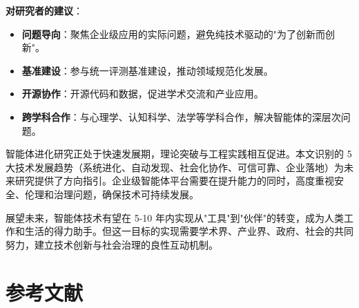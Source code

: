 \documentclass[12pt,a4paper]{article}
\begin{document}
\textbf{对研究者的建议}：
\begin{itemize}
    \item \textbf{问题导向}：聚焦企业级应用的实际问题，避免纯技术驱动的"为了创新而创新"。
    \item \textbf{基准建设}：参与统一评测基准建设，推动领域规范化发展。
    \item \textbf{开源协作}：开源代码和数据，促进学术交流和产业应用。
    \item \textbf{跨学科合作}：与心理学、认知科学、法学等学科合作，解决智能体的深层次问题。
\end{itemize}

智能体进化研究正处于快速发展期，理论突破与工程实践相互促进。本文识别的 5 大技术发展趋势（系统进化、自动发现、社会化协作、可信可靠、企业落地）为未来研究提供了方向指引。企业级智能体平台需要在提升能力的同时，高度重视安全、伦理和治理问题，确保技术可持续发展。

展望未来，智能体技术有望在 5-10 年内实现从"工具"到"伙伴"的转变，成为人类工作和生活的得力助手。但这一目标的实现需要学术界、产业界、政府、社会的共同努力，建立技术创新与社会治理的良性互动机制。

\section*{参考文献}
\end{document}

